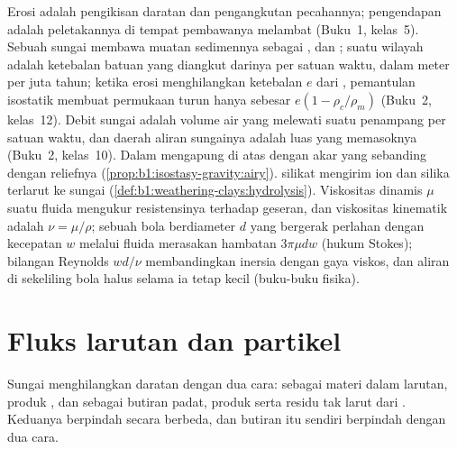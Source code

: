 \begin{recall}
Erosi adalah pengikisan daratan dan pengangkutan pecahannya; pengendapan adalah peletakannya di tempat pembawanya melambat (Buku~1, kelas~5). Sebuah sungai membawa muatan sedimennya sebagai ,  dan ;  suatu wilayah adalah ketebalan batuan yang diangkut darinya per satuan waktu, dalam meter per juta tahun; ketika erosi menghilangkan ketebalan $e$ dari , pemantulan isostatik membuat permukaan turun hanya sebesar $e(1 - \rho_c/\rho_m)$ (Buku~2, kelas~12). Debit sungai adalah volume air yang melewati suatu penampang per satuan waktu, dan daerah aliran sungainya adalah luas yang memasoknya (Buku~2, kelas~10). Dalam   mengapung di atas  dengan akar yang sebanding dengan reliefnya (\cref{prop:b1:isostasy-gravity:airy}).  silikat mengirim ion dan silika terlarut ke sungai (\cref{def:b1:weathering-clays:hydrolysis}). Viskositas dinamis $\mu$ suatu fluida mengukur resistensinya terhadap geseran, dan viskositas kinematik adalah $\nu = \mu/\rho$; sebuah bola berdiameter $d$ yang bergerak perlahan dengan kecepatan $w$ melalui fluida merasakan hambatan $3\pi\mu d w$ (hukum Stokes); bilangan Reynolds $w d/\nu$ membandingkan inersia dengan gaya viskos, dan aliran di sekeliling bola halus selama ia tetap kecil (buku-buku fisika).
\end{recall}

\section{Fluks larutan dan partikel}\label{sec:b1:erosion-transport:fluxes}

Sungai menghilangkan daratan dengan dua cara: sebagai materi dalam larutan, produk , dan sebagai butiran padat, produk  serta residu tak larut dari . Keduanya berpindah secara berbeda, dan butiran itu sendiri berpindah dengan dua cara.

